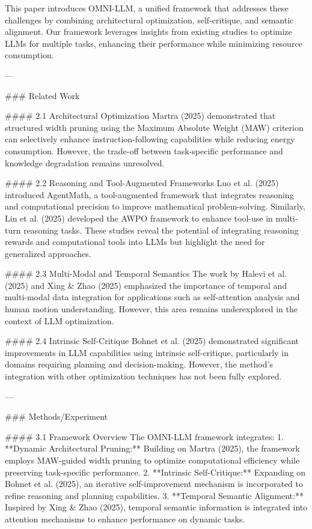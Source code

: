 This paper introduces OMNI-LLM, a unified framework that addresses these challenges by combining architectural optimization, self-critique, and semantic alignment. Our framework leverages insights from existing studies to optimize LLMs for multiple tasks, enhancing their performance while minimizing resource consumption.

---

### Related Work  

#### 2.1 Architectural Optimization  
Martra (2025) demonstrated that structured width pruning using the Maximum Absolute Weight (MAW) criterion can selectively enhance instruction-following capabilities while reducing energy consumption. However, the trade-off between task-specific performance and knowledge degradation remains unresolved.

#### 2.2 Reasoning and Tool-Augmented Frameworks  
Luo et al. (2025) introduced AgentMath, a tool-augmented framework that integrates reasoning and computational precision to improve mathematical problem-solving. Similarly, Lin et al. (2025) developed the AWPO framework to enhance tool-use in multi-turn reasoning tasks. These studies reveal the potential of integrating reasoning rewards and computational tools into LLMs but highlight the need for generalized approaches.

#### 2.3 Multi-Modal and Temporal Semantics  
The work by Halevi et al. (2025) and Xing & Zhao (2025) emphasized the importance of temporal and multi-modal data integration for applications such as self-attention analysis and human motion understanding. However, this area remains underexplored in the context of LLM optimization.

#### 2.4 Intrinsic Self-Critique  
Bohnet et al. (2025) demonstrated significant improvements in LLM capabilities using intrinsic self-critique, particularly in domains requiring planning and decision-making. However, the method's integration with other optimization techniques has not been fully explored.

---

### Methods/Experiment  

#### 3.1 Framework Overview  
The OMNI-LLM framework integrates:  
1. **Dynamic Architectural Pruning:** Building on Martra (2025), the framework employs MAW-guided width pruning to optimize computational efficiency while preserving task-specific performance.  
2. **Intrinsic Self-Critique:** Expanding on Bohnet et al. (2025), an iterative self-improvement mechanism is incorporated to refine reasoning and planning capabilities.  
3. **Temporal Semantic Alignment:** Inspired by Xing & Zhao (2025), temporal semantic information is integrated into attention mechanisms to enhance performance on dynamic tasks.

